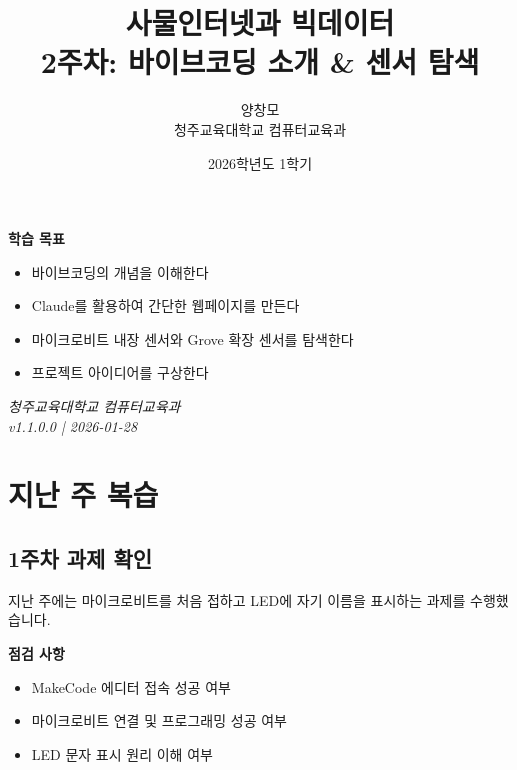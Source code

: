 \documentclass[11pt, a4paper]{article}
\title{
  \vspace{-2cm}
  {\Huge\bfseries\color{NavyBlue} 사물인터넷과 빅데이터}\\[0.5em]
  {\LARGE 2주차: 바이브코딩 소개 \& 센서 탐색}
}
\author{
  양창모\\
  청주교육대학교 컴퓨터교육과
}
\date{2026학년도 1학기}
\begin{document}
\maketitle
\thispagestyle{empty}

\vfill

\begin{center}
\begin{tcolorbox}[width=0.8\textwidth, colback=blue!5, colframe=NavyBlue]
\centering
\large
\textbf{학습 목표}

\vspace{0.5em}

\begin{itemize}[leftmargin=2em]
  \item 바이브코딩의 개념을 이해한다
  \item Claude를 활용하여 간단한 웹페이지를 만든다
  \item 마이크로비트 내장 센서와 Grove 확장 센서를 탐색한다
  \item 프로젝트 아이디어를 구상한다
\end{itemize}
\end{tcolorbox}
\end{center}

\vfill

\begin{center}
\small
\textit{청주교육대학교 컴퓨터교육과}\\
\textit{v1.1.0.0 | 2026-01-28}
\end{center}

\newpage

\tableofcontents
\newpage

\section{지난 주 복습}

\subsection{1주차 과제 확인}

지난 주에는 마이크로비트를 처음 접하고 LED에 자기 이름을 표시하는 과제를 수행했습니다.

\begin{keypoint}
\textbf{점검 사항}
\begin{itemize}
  \item MakeCode 에디터 접속 성공 여부
  \item 마이크로비트 연결 및 프로그래밍 성공 여부
  \item LED 문자 표시 원리 이해 여부
\end{itemize}
\end{keypoint}
\end{document}
